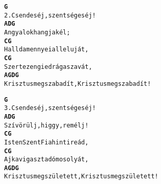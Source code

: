 \newpage
{}
\kottastart
{}
\kottaend
\begin{minipage}{\textwidth}
\begin{alltt}
\textbf{     G}
2. Csendes éj, szentséges éj!
\textbf{   A     D   G}
   Angyalok hangja kél;
\textbf{    C                     G}
   Halld a mennyei alleluját,
\textbf{     C              G}
   Szerte zengi e drága szavát,
\textbf{     A               G         D           G}
   Krisztus megszabadít, Krisztus megszabadít!
\end{alltt}
\vspace{0.0cm}
\versszakspacing
\end{minipage}
\begin{minipage}{\textwidth}
\begin{alltt}
\textbf{     G}
3. Csendes éj, szentséges éj!
\textbf{     A    D     G}
   Szív örülj, higgy, remélj!
\textbf{   C                       G}
   Isten Szent Fia hinti reád,
\textbf{   C              G}
   Ajka vigaszt adó mosolyát,
\textbf{     A               G          D           G}
   Krisztus megszületett, Krisztus megszületett!
\end{alltt}
\vspace{0.0cm}
\versszakspacing
\end{minipage}
